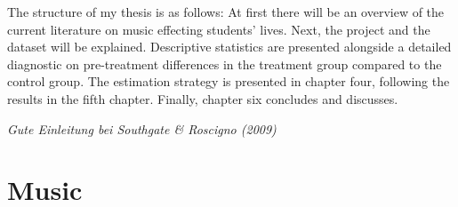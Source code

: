 \documentclass[a4, 12pt]{article}
\begin{document}
The structure of my thesis is as follows: At first there will be an overview of the current literature on music effecting students' lives. Next, the project and the dataset will be explained. Descriptive statistics are presented alongside a detailed diagnostic on pre-treatment differences in the treatment group compared to the control group. The estimation strategy is presented in chapter four, following the results in the fifth chapter. Finally, chapter six concludes and discusses.

\emph{Gute Einleitung bei Southgate \& Roscigno (2009)}

\hypertarget{music}{%
\section{Music}\label{music}}

\clearpage
\end{document}
